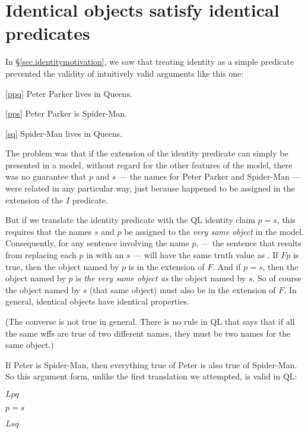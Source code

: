 \section{Identical objects satisfy identical predicates}

In \S\ref{sec.identitymotivation}, we saw that treating identity as a simple predicate prevented the validity of intuitively valid arguments like  this one:

\begin{earg}
\item[\ref{ppq}] Peter Parker lives in Queens.
\item[\ref{pps}] Peter Parker is Spider-Man.
\item[\ref{sq}] Spider-Man lives in Queens.
\end{earg}

The problem was that if the extension of the identity predicate can simply be presented in a model, without regard for the other features of the model, there was no guarantee that $p$ and $s$ --- the names for Peter Parker and Spider-Man --- were related in any particular way, just because  happened to be assigned in the extension of the $I$ predicate.

But if we translate the identity predicate with the QL identity claim $p{=}s$, this requires that the names $s$ and $p$ be assigned to the \emph{very same object} in the model. Consequently, for any sentence \metaA{} involving the name $p$, \metaA{} --- the sentence that results from replacing each $p$ in \metaA{} with an $s$ --- will have the same truth value as \metaA{}. If $Fp$ is true, then the object named by $p$ is in the extension of $F$. And if $p{=}s$, then the object named by $p$ is \emph{the very same object as} the object named by $s$. So of course the object named by $s$ (that same object) must also be in the extension of $F$. In general, identical objects have identical properties.

(The converse is not true in general. There is no rule in QL that says that if all the same wffs are true of two different names, they must be two names for the same object.)

If Peter is Spider-Man, then everything true of Peter is also true of Spider-Man. So this argument form, unlike the first translation we attempted, is valid in QL:

\begin{earg}
\item[] $Lpq$
\item[] $p{=}s$
\item[\therefore] $Lsq$
\end{earg}

